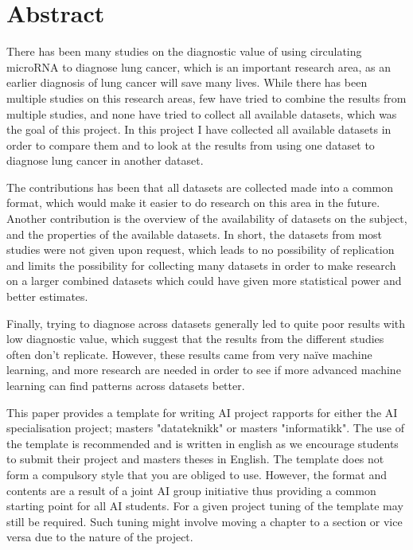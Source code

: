 \section*{Abstract}

There has been many studies on the diagnostic value of using circulating microRNA to diagnose lung cancer, which is an important research area, as an earlier diagnosis of lung cancer will save many lives. 
While there has been multiple studies on this research areas, few have tried to combine the results from multiple studies, and none have tried to collect all available datasets, which was the goal of this project.
In this project I have collected all available datasets in order to compare them and to look at the results from using one dataset to diagnose lung cancer in another dataset.

The contributions has been that all datasets are collected made into a common format, which would make it easier to do research on this area in the future. Another contribution is the overview of the availability of datasets on the subject, and the properties of the available datasets. In short, the datasets from most studies were not given upon request, which leads to no possibility of replication and limits the possibility for collecting many datasets in order to make research on a larger combined datasets which could have given more statistical power and better estimates.

Finally, trying to diagnose across datasets generally led to quite poor results with low diagnostic value, which suggest that the results from the different studies often don't replicate. However, these results came from very naïve machine learning, and more research are needed in order to see if more advanced machine learning can find patterns across datasets better.
\iffalse

This paper provides a template for writing AI project rapports for either the AI specialisation project; masters "datateknikk" or masters "informatikk". The use of the template is recommended and is written in english as we encourage students to submit their project and masters theses in English. 
The template does not form a compulsory style that you are obliged to use. However, the format and contents are a result of a joint AI group initiative thus providing a common starting point for all AI students. For a given project tuning of the template may still be required. Such tuning might involve moving a chapter to a section or vice versa due to the nature of the project. 


